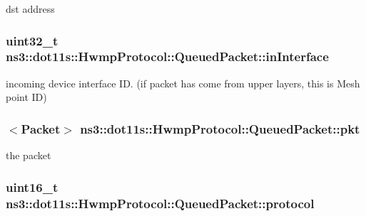 dst address 

\subsubsection[{\texorpdfstring{in\+Interface}{inInterface}}]{\setlength{\rightskip}{0pt plus 5cm}uint32\+\_\+t ns3\+::dot11s\+::\+Hwmp\+Protocol\+::\+Queued\+Packet\+::in\+Interface}\hypertarget{structns3_1_1dot11s_1_1HwmpProtocol_1_1QueuedPacket_a81d6fde715ecc2f22c985bd47e46b3d6}{}\label{structns3_1_1dot11s_1_1HwmpProtocol_1_1QueuedPacket_a81d6fde715ecc2f22c985bd47e46b3d6}


incoming device interface ID. (if packet has come from upper layers, this is Mesh point ID) 

\subsubsection[{\texorpdfstring{pkt}{pkt}}]{$<${\bf Packet}$>$ ns3\+::dot11s\+::\+Hwmp\+Protocol\+::\+Queued\+Packet\+::pkt}\hypertarget{structns3_1_1dot11s_1_1HwmpProtocol_1_1QueuedPacket_ad313ffb587733d3750ba16f9a2a09713}{}\label{structns3_1_1dot11s_1_1HwmpProtocol_1_1QueuedPacket_ad313ffb587733d3750ba16f9a2a09713}


the packet 

\subsubsection[{\texorpdfstring{protocol}{protocol}}]{\setlength{\rightskip}{0pt plus 5cm}uint16\+\_\+t ns3\+::dot11s\+::\+Hwmp\+Protocol\+::\+Queued\+Packet\+::protocol}\hypertarget{structns3_1_1dot11s_1_1HwmpProtocol_1_1QueuedPacket_a5181acce44c93a82a61c557409347984}{}\label{structns3_1_1dot11s_1_1HwmpProtocol_1_1QueuedPacket_a5181acce44c93a82a61c557409347984}


